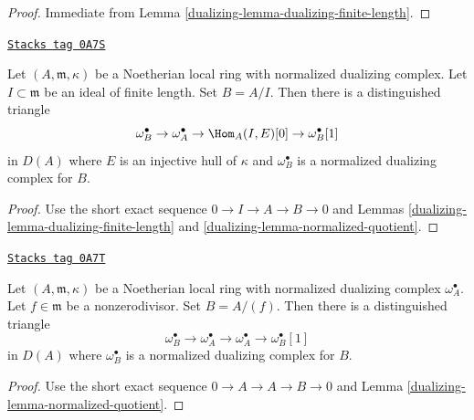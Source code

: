 \begin{proof}

Immediate from Lemma \ref{dualizing-lemma-dualizing-finite-length}.
\end{proof}

\begin{lemma}
\label{dualizing-lemma-divide-by-finite-length-ideal}
\href{https://stacks.math.columbia.edu/tag/0A7S}{\texttt{Stacks tag 0A7S}}

Let $(A, \mathfrak m, \kappa)$ be a Noetherian local
ring with normalized dualizing complex. Let $I \subset \mathfrak m$ be an
ideal of finite length. Set $B = A/I$. Then there is a distinguished
triangle
$$
\omega_B^\bullet \to \omega_A^\bullet \to \Hom_A(I, E)[0] \to
\omega_B^\bullet[1]
$$
in $D(A)$ where $E$ is an injective hull of $\kappa$ and
$\omega_B^\bullet$ is a normalized dualizing complex for $B$.
\end{lemma}

\begin{proof}

Use the short exact sequence $0 \to I \to A \to B \to 0$
and Lemmas \ref{dualizing-lemma-dualizing-finite-length} and
\ref{dualizing-lemma-normalized-quotient}.
\end{proof}

\begin{lemma}
\label{dualizing-lemma-divide-by-nonzerodivisor}
\href{https://stacks.math.columbia.edu/tag/0A7T}{\texttt{Stacks tag 0A7T}}

Let $(A, \mathfrak m, \kappa)$ be a Noetherian local
ring with normalized dualizing complex $\omega_A^\bullet$.
Let $f \in \mathfrak m$ be a
nonzerodivisor. Set $B = A/(f)$. Then there is a distinguished
triangle
$$
\omega_B^\bullet \to \omega_A^\bullet \to \omega_A^\bullet \to
\omega_B^\bullet[1]
$$
in $D(A)$ where $\omega_B^\bullet$ is a normalized dualizing complex
for $B$.
\end{lemma}

\begin{proof}

Use the short exact sequence $0 \to A \to A \to B \to 0$
and Lemma \ref{dualizing-lemma-normalized-quotient}.
\end{proof}

